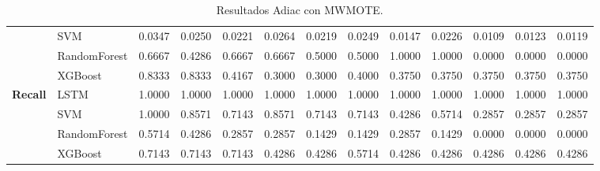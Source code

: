 \begin{table}[h]
\begin{adjustbox}{max width=15cm}
\begin{tabular}{|c|l|r|r|r|r|r|r|r|r|r|r|r|}
			& SVM &  0.0347 &  0.0250 &  0.0221 &  0.0264 &  0.0219 &  0.0249 &  0.0147 &  0.0226 &  0.0109 &  0.0123 &  0.0119 \\
			& RandomForest &  0.6667 &  0.4286 &  0.6667 &  0.6667 &  0.5000 &  0.5000 &  1.0000 &  1.0000 &  0.0000 &  0.0000 &  0.0000 \\
			& XGBoost &  0.8333 &  0.8333 &  0.4167 &  0.3000 &  0.3000 &  0.4000 &  0.3750 &  0.3750 &  0.3750 &  0.3750 &  0.3750 \\
			\hline
			\textbf{Recall} & LSTM &  1.0000 &  1.0000 &  1.0000 &  1.0000 &  1.0000 &  1.0000 &  1.0000 &  1.0000 &  1.0000 &  1.0000 &  1.0000 \\
			& SVM &  1.0000 &  0.8571 &  0.7143 &  0.8571 &  0.7143 &  0.7143 &  0.4286 &  0.5714 &  0.2857 &  0.2857 &  0.2857 \\
			& RandomForest &  0.5714 &  0.4286 &  0.2857 &  0.2857 &  0.1429 &  0.1429 &  0.2857 &  0.1429 &  0.0000 &  0.0000 &  0.0000 \\
			& XGBoost &  0.7143 &  0.7143 &  0.7143 &  0.4286 &  0.4286 &  0.5714 &  0.4286 &  0.4286 &  0.4286 &  0.4286 &  0.4286 \\
			\hline
		\end{tabular}
	\end{adjustbox}
	\caption{Resultados Adiac con MWMOTE.}
	\label{tab:Adiac_MWMOTE}
\end{table}
